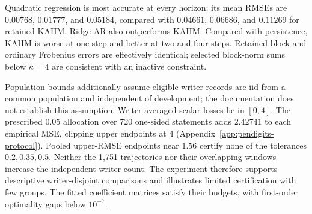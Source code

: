 Quadratic regression is most accurate at every horizon: its mean RMSEs are
$0.00768$, $0.01777$, and $0.05184$, compared with $0.04661$, $0.06686$,
and $0.11269$ for retained KAHM.
Ridge AR also outperforms KAHM. Compared with persistence, KAHM is worse at
one step and better at two and four steps. Retained-block and ordinary
Frobenius errors are effectively identical; selected block-norm sums below
$\kappa=4$ are consistent with an inactive constraint.

Population bounds additionally assume eligible writer records are iid from
a common population and independent of development; the documentation does
not establish this assumption. Writer-averaged scalar losses lie in $[0,4]$.
The prescribed $0.05$ allocation over 720 one-sided statements adds
$2.42741$ to each empirical MSE, clipping upper endpoints at 4
(Appendix~\ref{app:pendigits-protocol}). Pooled upper-RMSE endpoints near
$1.56$ certify none of the tolerances $0.2,0.35,0.5$.
Neither the 1,751 trajectories nor their overlapping windows increase the
independent-writer count. The experiment therefore supports descriptive
writer-disjoint comparisons and illustrates limited certification with few
groups. The fitted coefficient matrices satisfy their budgets, with
first-order optimality gaps below $10^{-7}$.
